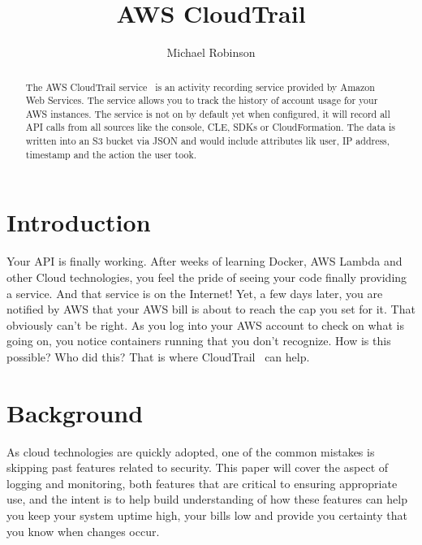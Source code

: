 
\title{AWS CloudTrail}

\author{Michael Robinson}


\renewcommand{\shortauthors}{M. Robinson}


\begin{abstract}
The AWS CloudTrail service~\cite{hid-sp18-518-CloudTrail} is an activity 
recording service provided by Amazon Web Services. The service allows you to 
track the history of account usage for your AWS instances. The service is not 
on by default yet when configured, it will record all API calls from all 
sources like the console, CLE, SDKs or CloudFormation. The data is written 
into an S3 bucket via JSON and would include attributes lik user, IP address, 
timestamp and the action the user took.
\end{abstract}


\maketitle

\section{Introduction}

Your API is finally working. After weeks of learning Docker, AWS Lambda and 
other Cloud technologies, you feel the pride of seeing your code finally 
providing a service. And that service is on the Internet! Yet, a few days 
later, you are notified by AWS that your AWS bill is about to reach the cap 
you set for it. That obviously can’t be right. As you log into your AWS 
account to check on what is going on, you notice containers running that you 
don’t recognize. How is this possible? Who did this? That is where 
CloudTrail~\cite{hid-sp18-518-CloudTrail} can help.

\section{Background}

As cloud technologies are quickly adopted, one of the common mistakes is 
skipping past features related to security. This paper will cover the aspect 
of logging and monitoring, both features that are critical to ensuring 
appropriate use, and the intent is to help build understanding of how these 
features can help you keep your system uptime high, your bills low and provide 
you certainty that you know when changes occur.

